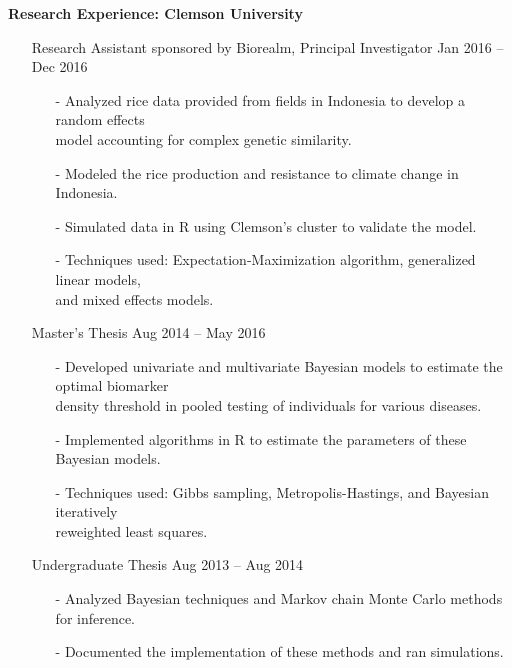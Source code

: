 \documentclass[10pt]{article}
\begin{document}
\noindent
\textbf{Research Experience: Clemson University}
\vspace{-0.25cm}
\begin{itemize}
\item[] Research Assistant sponsored by Biorealm, Principal Investigator \hfill Jan 2016 -- Dec 2016
\vspace{-0.25cm}
\begin{itemize}
\item[-] Analyzed rice data provided from fields in Indonesia to develop a random effects \\ model accounting for complex genetic similarity.
\vspace{-0.1cm}
\item[-] Modeled the rice production and resistance to climate change in Indonesia.
\vspace{-0.1cm}
\item[-] Simulated data in R using Clemson's cluster to validate the model.
\vspace{-0.1cm}
\item[-] Techniques used: Expectation-Maximization algorithm, generalized linear models, \\ and mixed effects models.
\vspace{-0.25cm}
\end{itemize}
\item[] Master's Thesis \hfill Aug 2014 -- May 2016
\vspace{-0.25cm}
\begin{itemize}
\item[-] Developed univariate and multivariate Bayesian models to estimate the optimal biomarker \\ density threshold in pooled testing of individuals for various diseases.
\vspace{-0.1cm}
\item[-] Implemented algorithms in R to estimate the parameters of these Bayesian models.
\vspace{-0.1cm}
\item[-] Techniques used: Gibbs sampling, Metropolis-Hastings, and Bayesian iteratively \\ reweighted least squares.
\vspace{-0.25cm}
\end{itemize}
\item[] Undergraduate Thesis \hfill Aug 2013 -- Aug 2014
\vspace{-0.25cm}
\begin{itemize}
\item[-] Analyzed Bayesian techniques and Markov chain Monte Carlo methods for inference.
\vspace{-0.1cm}
\item[-] Documented the implementation of these methods and ran simulations.
\end{itemize}
\end{itemize}
\end{document}
